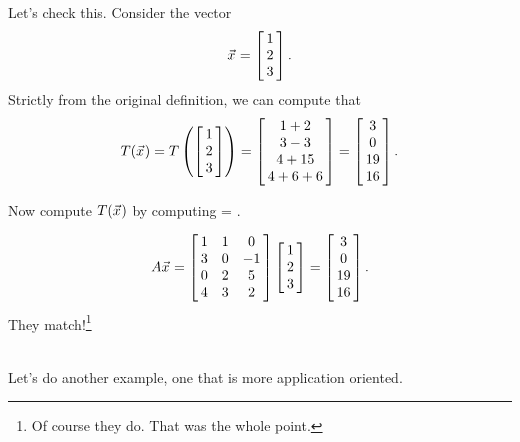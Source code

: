 {Let's check this. Consider the vector $$\vx = \bmx{c}1\\2\\3\emx.$$ Strictly from the original definition, we can compute that $$T(\vx) = T\left(\bmx{c}1\\2\\3\emx\right) = \bmx{c} 1+2\\3-3\\4+15\\4+6+6 \emx = \bmx{c} 3\\0\\19\\16\emx.$$

Now compute $T(\vx)$ by computing \TT\vx = \tta\vx.

$$\tta\vx = \bmx{ccc} 1&1&0 \\ 3 & 0&-1\\ 0&2&5\\ 4&3&2\emx\bmx{c}1\\2\\3\emx = \bmx{c} 3\\0\\19\\16\emx.$$
They match!\footnote{Of course they do. That was the whole point.} 
}\\

Let's do another example, one that is more application oriented.\\

